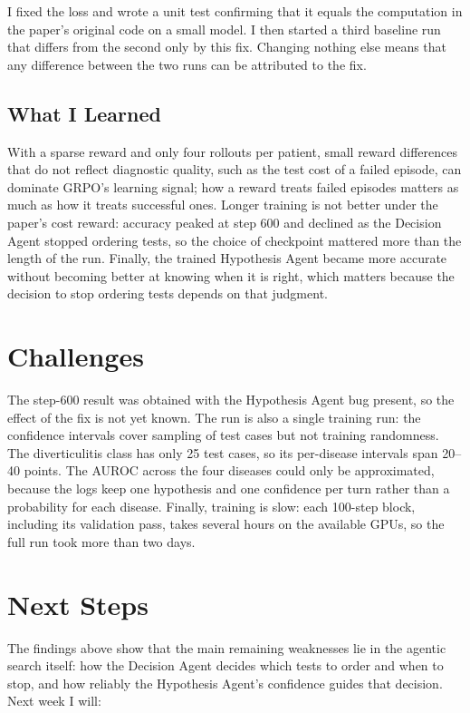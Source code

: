 \documentclass[11pt]{article}
\begin{document}
I fixed the loss and wrote a unit test confirming that it equals the
computation in the paper's original code on a small model. I then started a
third baseline run that differs from the second only by this fix. Changing
nothing else means that any difference between the two runs can be attributed
to the fix.

\subsection*{What I Learned}

With a sparse reward and only four rollouts per patient, small reward
differences that do not reflect diagnostic quality, such as the test cost of a
failed episode, can dominate GRPO's learning signal; how a reward treats
failed episodes matters as much as how it treats successful ones. Longer
training is not better under the paper's cost reward: accuracy peaked at step
600 and declined as the Decision Agent stopped ordering tests, so the choice
of checkpoint mattered more than the length of the run. Finally, the trained
Hypothesis Agent became more accurate without becoming better at knowing when
it is right, which matters because the decision to stop ordering tests depends
on that judgment.

\section{Challenges}

The step-600 result was obtained with the Hypothesis Agent bug present, so the
effect of the fix is not yet known. The run is also a single training run:
the confidence intervals cover sampling of test cases but not training
randomness. The diverticulitis class has only 25 test cases, so its
per-disease intervals span 20--40 points. The AUROC across the four diseases
could only be approximated, because the logs keep one hypothesis and one
confidence per turn rather than a probability for each disease. Finally,
training is slow: each 100-step block, including its validation pass, takes
several hours on the available GPUs, so the full run took more than two days.

\section{Next Steps}

The findings above show that the main remaining weaknesses lie in the agentic
search itself: how the Decision Agent decides which tests to order and when to
stop, and how reliably the Hypothesis Agent's confidence guides that decision.
Next week I will:
\end{document}
